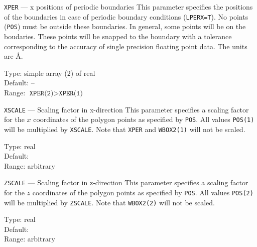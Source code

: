\begin{keydescription}{\texttt{XPER} --- x positions of periodic boundaries}
%
  This parameter specifies the positions of the boundaries in case of 
  periodic boundary conditions (\texttt{LPERX=T}). No points (\texttt{POS}) 
  must be outside these boundaries. In general, some points will be on the
  boudaries. These points will be snapped to the boundary with a tolerance 
  corresponding to the accuracy of single precision floating point data.
  The units are \AA. 
  \begin{keytab}
    Type:    \> simple array (2) of real \\
    Default: \> -- \\
    Range:   \> $\texttt{XPER(2)} > \texttt{XPER(1)}$
  \end{keytab}
\end{keydescription}

\begin{keydescription}{\texttt{XSCALE} --- Scaling factor in x-direction}
%
  This parameter specifies a scaling factor for the $x$ coordinates of the
  polygon points as specified by \texttt{POS}. All values \texttt{POS(1)} will
  be multiplied by \texttt{XSCALE}. Note that \texttt{XPER} and
  \texttt{WBOX2(1)} will not be scaled. 
  \begin{keytab}
    Type:    \> real \\
    Default:  \\
    Range:   \> arbitrary
  \end{keytab}
\end{keydescription}

\begin{keydescription}{\texttt{ZSCALE} --- Scaling factor in z-direction}
%
  This parameter specifies a scaling factor for the $z$ coordinates of the
  polygon points as specified by \texttt{POS}. All values \texttt{POS(2)}
  will be multiplied by \texttt{ZSCALE}. Note that \texttt{WBOX2(2)} will not be
  scaled.
  \begin{keytab}
    Type:    \> real \\
    Default:  \\
    Range:   \> arbitrary
  \end{keytab}
\end{keydescription}

